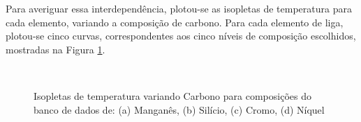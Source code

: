 \documentclass[brazil,tf,epusp]{usp}  %
\begin{document}
Para averiguar essa interdependência, plotou-se as isopletas de temperatura para cada elemento, variando a composição de carbono. Para cada elemento de liga, plotou-se cinco curvas, correspondentes aos cinco níveis de composição escolhidos, mostradas na Figura \ref{fig:db_isop}.

\begin{figure}[!h]
\hfill
{}\\
\caption{Isopletas de temperatura variando Carbono para composições do banco de dados de: (a) Manganês, (b) Silício, (c) Cromo, (d) Níquel}
\label{fig:db_isop}
\end{figure}
\end{document}
